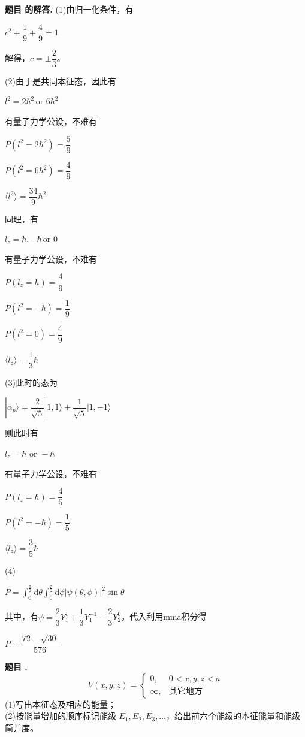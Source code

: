 \documentclass[12pt, a4paper, oneside]{ctexart}
\newcounter{problemname}
\newenvironment{problem}
  {\begin{shaded}\stepcounter{problemname}\par\noindent\textbf{题目 \theproblemname. }}
  {\end{shaded}\par}
\newenvironment{solution}
  {\par\noindent\textbf{题目 \theproblemname 的解答. }}
  {\par}
\begin{document}
\begin{solution}
  (1)由归一化条件，有

  \centerline{$c^2 + \dfrac{1}{9} + \dfrac{4}{9} = 1$}

  解得，$c = \pm \dfrac{2}{3}$。

  (2)由于是共同本征态，因此有

  \centerline{$l^2 = 2\hbar^2 \,\mathrm{or} \,\,6\hbar^2$}

  有量子力学公设，不难有

  \centerline{$P(l^2 = 2\hbar^2) = \dfrac{5}{9}$}

  \centerline{$P(l^2 = 6\hbar^2) = \dfrac{4}{9}$}

  \centerline{$\langle l^2 \rangle = \dfrac{34}{9} \hbar^2$}

  同理，有

  \centerline{$l_z = \hbar , -\hbar \,\mathrm{or} \,\,0$}

  有量子力学公设，不难有

  \centerline{$P(l_z = \hbar) = \dfrac{4}{9}$}

  \centerline{$P(l^2 = -\hbar) = \dfrac{1}{9}$}

  \centerline{$P(l^2 = 0) = \dfrac{4}{9}$}

  \centerline{$\langle l_z \rangle = \dfrac{1}{3} \hbar$}

  (3)此时的态为

  \centerline{$| \alpha_p \rangle = \dfrac{2}{\sqrt{5}} | 1,1\rangle +\dfrac{1}{\sqrt{5}} |1,-1\rangle$}

  则此时有

  \centerline{$l_z = \hbar  \,\,\mathrm{or} \,\, -\hbar$}

  有量子力学公设，不难有

  \centerline{$P(l_z = \hbar) = \dfrac{4}{5}$}

  \centerline{$P(l^2 = -\hbar) = \dfrac{1}{5}$}

  \centerline{$\langle l_z \rangle = \dfrac{3}{5} \hbar$}

  (4)

  \centerline{$P = \displaystyle\int_0^\frac{\pi}{2}\mathrm{d}\theta \int_0^\frac{\pi}{2} \mathrm{d}\phi |\psi(\theta,\phi)|^2\sin\theta$}

  其中，有$\psi = \dfrac{2}{3} Y_1^1 + \dfrac{1}{3} Y_1^{-1} - \dfrac{2}{3} Y_2^0$，代入利用mma积分得

  \centerline{$P = \dfrac{72-\sqrt{30}}{576}$}
\end{solution}

\begin{problem}
  \[
    V(x, y, z) = \begin{cases}
        0, & 0 < x, y, z < a \\
        \infty, & \text{其它地方}
    \end{cases}
\]
    (1)写出本征态及相应的能量；\\
    (2)按能量增加的顺序标记能级 $E_1, E_2, E_3, \ldots$，给出前六个能级的本征能量和能级简并度。

\end{problem}
\end{document}
